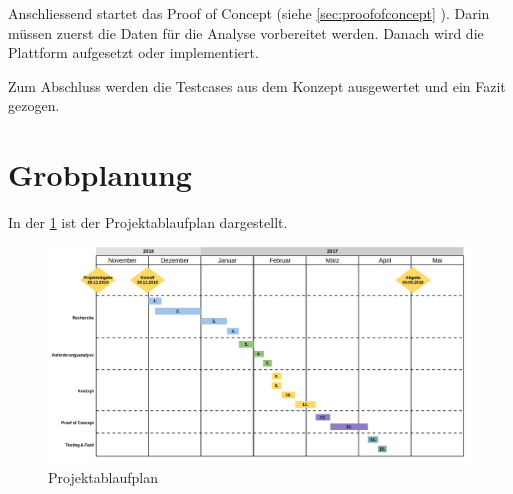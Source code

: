 Anschliessend startet das Proof of Concept (siehe \cref{sec:proofofconcept} ). Darin müssen zuerst die Daten für die Analyse vorbereitet werden. Danach wird die Plattform aufgesetzt oder implementiert.

Zum Abschluss werden die Testcases aus dem Konzept ausgewertet und ein Fazit gezogen.

\section{Grobplanung}
In der \cref{fig:einleitung:projektablaufplan}  ist der Projektablaufplan dargestellt.
\begin{figure}
	\centering
	\includegraphics[width=1\textwidth]{images/projektablaufplan}
	\caption{Projektablaufplan}
	\label{fig:einleitung:projektablaufplan}
\end{figure}
\\\\
